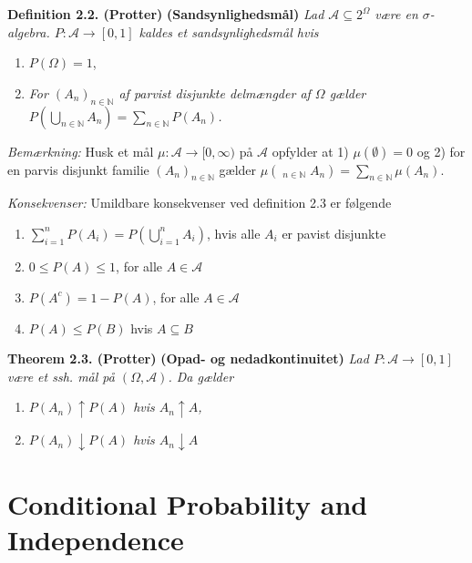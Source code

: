 \documentclass[a4paper,12pt,openany]{book}
\providecommand{\tightlist}{%
 \setlength{\itemsep}{0pt}\setlength{\parskip}{0pt}}
\begin{document}
\textbf{Definition 2.2. (Protter)} \textbf{(Sandsynlighedsmål)} \emph{Lad \(\mathcal{A}\subseteq2^\Omega\) være en \(\sigma\)-algebra. \(P : \mathcal{A}\to[0,1]\) kaldes et sandsynlighedsmål hvis}

\begin{enumerate}
\def\labelenumi{\arabic{enumi}.}
\tightlist
\item
  \(P(\Omega)=1\),
\item
  \emph{For \((A_n)_{n\in\mathbb{N}}\) af parvist disjunkte delmængder af \(\Omega\) gælder \(P\left(\bigcup_{n\in\mathbb{N}}A_n\right)=\sum_{n\in\mathbb{N}}P(A_n)\).}
\end{enumerate}

\emph{Bemærkning:} Husk et mål \(\mu : \mathcal{A}\to [0,\infty)\) på \(\mathcal{A}\) opfylder at 1) \(\mu(\emptyset)=0\) og 2) for en parvis disjunkt familie \((A_n)_{n\in\mathbb{N}}\) gælder \(\mu\left(\mathop{\dot{\bigcup}}_{n\in\mathbb{N}}A_n\right)=\sum_{n\in\mathbb{N}}\mu(A_n)\).

\emph{Konsekvenser:} Umildbare konsekvenser ved definition 2.3 er følgende

\begin{enumerate}
\def\labelenumi{\roman{enumi}.}
\tightlist
\item
  \(\sum_{i=1}^n P(A_i)=P\left(\bigcup_{i=1}^nA_i\right)\), hvis alle \(A_i\) er pavist disjunkte
\item
  \(0\le P(A)\le 1\), for alle \(A\in\mathcal{A}\)
\item
  \(P(A^c)=1-P(A)\), for alle \(A\in\mathcal{A}\)
\item
  \(P(A)\le P(B)\) hvis \(A\subseteq B\)
\end{enumerate}

\textbf{Theorem 2.3. (Protter)} \textbf{(Opad- og nedadkontinuitet)} \emph{Lad \(P : \mathcal{A}\to[0,1]\) være et ssh. mål på \((\Omega,\mathcal{A})\). Da gælder}

\begin{enumerate}
\def\labelenumi{\roman{enumi}.}
\setcounter{enumi}{2}
\tightlist
\item
  \emph{\(P(A_n)\uparrow P(A)\) hvis \(A_n\uparrow A\),}
\item
  \emph{\(P(A_n)\downarrow P(A)\) hvis \(A_n\downarrow A\)}
\end{enumerate}

\hypertarget{conditional-probability-and-independence}{%
\section{Conditional Probability and Independence}\label{conditional-probability-and-independence}}
\end{document}
